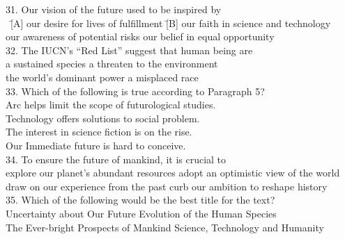 \begin{tabbing}
31. Our vision of the future used to be inspired by\\
\hspace{0cm}\ \= [A] our desire for lives of fulfillment \quad\quad\quad\quad
\= [B] our faith in science and technology\\
\> [C] our awareness of potential risks
\> [D] our belief in equal opportunity\\

32. The IUCN’s “Red List” suggest that human being are\\
\> [A] a sustained species
\> [B] a threaten to the environment\\
\> [C] the world’s dominant power
\> [D] a misplaced race\\

33. Which of the following is true according to Paragraph 5?\\
\> [A] Arc helps limit the scope of futurological studies.\\
\> [B] Technology offers solutions to social problem.\\
\> [C] The interest in science fiction is on the rise.\\
\> [D] Our Immediate future is hard to conceive.\\

34. To ensure the future of mankind, it is crucial to\\
\> [A] explore our planet’s abundant resources
\> [B] adopt an optimistic view of the world\\
\> [C] draw on our experience from the past
\> [D] curb our ambition to reshape history\\

35. Which of the following would be the best title for the text?\\
\> [A] Uncertainty about Our Future
\> [B] Evolution of the Human Species\\
\> [C] The Ever-bright Prospects of Mankind
\> [D] Science, Technology and Humanity
\end{tabbing}